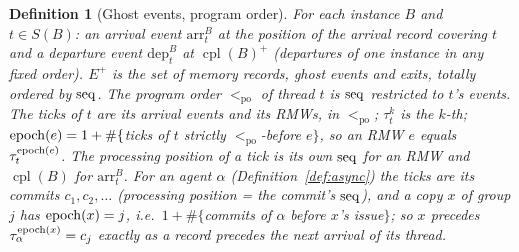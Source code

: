 \documentclass[11pt]{article}
\newtheorem{definition}[theorem]{Definition}
\theoremstyle{remark}
\DeclareMathOperator{\cpl}{cpl}\DeclareMathOperator{\Exec}{Exec}\DeclareMathOperator{\rf}{rf}
\newcommand{\PO}{<_{\mathrm{po}}}\newcommand{\HB}{\to_{\mathrm{hb}}}\newcommand{\HBr}{\trianglelefteq_{\mathrm{hb}}}
\newcommand{\arr}[2]{\mathrm{arr}^{#2}_{#1}}\newcommand{\dep}[2]{\mathrm{dep}^{#2}_{#1}}\newcommand{\ext}[1]{\mathrm{exit}_{#1}}
\newcommand{\Eplus}{E^{+}}\newcommand{\Fr}{\mathcal{F}}\newcommand{\Pred}{\mathcal{P}}
\begin{document}
\begin{definition}[Ghost events, program order]\label{def:po}
For each instance $B$ and $t\in S(B)$: an \emph{arrival event} $\arr{t}{B}$ at the position
of the arrival record covering $t$ and a \emph{departure event} $\dep{t}{B}$ at
$\cpl(B)^{+}$ (departures of one instance in any fixed order). $\Eplus$ is the set of memory
records, ghost events and exits, totally ordered by $\operatorname{seq}$. The program order $\PO$ of
thread $t$ is $\operatorname{seq}$ restricted to $t$'s events. The \emph{ticks} of $t$ are its arrival
events and its RMWs, in $\PO$; $\tau^k_t$ is the $k$-th; $\operatorname{epoch}(e)=1+\#\{$ticks of $t$
strictly $\PO$-before $e\}$, so an RMW $e$ equals $\tau^{\operatorname{epoch}(e)}_t$. The
\emph{processing position} of a tick is its own $\operatorname{seq}$ for an RMW and $\cpl(B)$ for
$\arr{t}{B}$. For an agent $\alpha$ (Definition~\ref{def:async}) the ticks are its commits
$c_1,c_2,\dots$ (processing position = the commit's $\operatorname{seq}$), and a copy $x$ of group $j$ has
$\operatorname{epoch}(x)=j$, i.e.\ $1+\#\{$commits of $\alpha$ before $x$'s issue$\}$; so $x$ precedes
$\tau^{\operatorname{epoch}(x)}_\alpha=c_j$ exactly as a record precedes the next arrival of its thread.
\end{definition}
\end{document}
